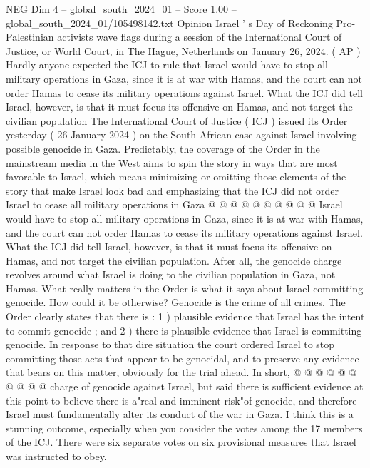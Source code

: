 \begin{textsample}{NEG Dim 4 – global\_south\_2024\_01 – Score 1.00 – global\_south\_2024\_01/105498142.txt}  \label{ex:f4_neg_086}
Opinion Israel ' s Day of Reckoning Pro-Palestinian activists wave flags during a session of the International Court of Justice, or World Court, in The Hague, Netherlands on January 26, 2024. ( AP ) Hardly anyone expected the ICJ to rule that Israel would have to stop all military operations in Gaza, since it is at war with Hamas, and the court can not order Hamas to cease its military operations against Israel.
What the ICJ did tell Israel, however, is that it must focus its offensive on Hamas, and not target the civilian population The International Court of Justice ( ICJ ) issued its Order yesterday ( 26 January 2024 ) on the South African case against Israel involving possible genocide in Gaza.
Predictably, the coverage of the Order in the mainstream media in the West aims to spin the story in ways that are most favorable to Israel, which means minimizing or omitting those elements of the story that make Israel look bad and emphasizing that the ICJ did not order Israel to cease all military operations in Gaza @ @ @ @ @ @ @ @ @ @ Israel would have to stop all military operations in Gaza, since it is at war with Hamas, and the court can not order Hamas to cease its military operations against Israel.
What the ICJ did tell Israel, however, is that it must focus its offensive on Hamas, and not target the civilian population.
After all, the genocide charge revolves around what Israel is doing to the civilian population in Gaza, not Hamas.
What really matters in the Order is what it says about Israel committing genocide.
How could it be otherwise?
Genocide is the crime of all crimes.
The Order clearly states that there is : 1 ) plausible evidence that Israel has the intent to commit genocide ; and 2 ) there is plausible evidence that Israel is committing genocide.
In response to that dire situation the court ordered Israel to stop committing those acts that appear to be genocidal, and to preserve any evidence that bears on this matter, obviously for the trial ahead.
In short, @ @ @ @ @ @ @ @ @ @ charge of genocide against Israel, but said there is sufficient evidence at this point to believe there is a"real and imminent risk"of genocide, and therefore Israel must fundamentally alter its conduct of the war in Gaza.
I think this is a stunning outcome, especially when you consider the votes among the 17 members of the ICJ.
There were six separate votes on six provisional measures that Israel was instructed to obey.

\end{textsample}
